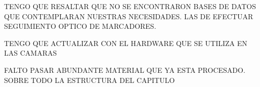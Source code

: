 TENGO QUE RESALTAR QUE NO SE ENCONTRARON BASES DE DATOS QUE CONTEMPLARAN NUESTRAS NECESIDADES. LAS DE EFECTUAR SEGUIMIENTO OPTICO DE MARCADORES.


TENGO QUE ACTUALIZAR CON EL HARDWARE QUE SE UTILIZA EN LAS CAMARAS


FALTO PASAR ABUNDANTE MATERIAL QUE YA ESTA PROCESADO. SOBRE TODO LA ESTRUCTURA DEL CAPITULO 
